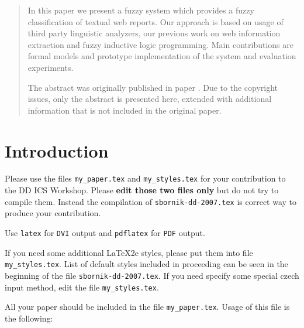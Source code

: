 
\MakeContributionTitle

\begin{multicols}{2}

\begin{abstract}
In this paper we present a fuzzy system which provides a fuzzy classification of textual web reports. Our approach is based on usage of third party linguistic analyzers, our previous work on web information extraction and fuzzy inductive logic programming. Main contributions are formal models and prototype implementation of the system and evaluation experiments. 

\vspace{.2cm}

The abstract was originally published in paper \cite{Dedek:FuzzWI}. Due to the copyright issues, only the abstract is presented here, extended with additional information that is not included in the original paper.
\end{abstract}


\section{Introduction}
Please use the files {\tt my\_paper.tex} and {\tt my\_styles.tex} for your contribution to
the DD ICS Workshop. Please {\bf edit those two files only} but do not try to compile them. 
Instead the compilation of {\tt sbornik-dd-2007.tex} is correct way to produce your
contribution. 

Use  {\tt latex} for {\tt DVI} output and  {\tt pdflatex} for {\tt PDF} output.

 
 If you need some additional \LaTeX2e styles, please put them into file {\tt
   my\_styles.tex}. List of default styles included in proceeding can be seen in the
 beginning of the file {\tt sbornik-dd-2007.tex}.
If you need specify some special czech input method, edit the file {\tt my\_styles.tex}. 


All your paper should be included in the file {\tt my\_paper.tex}. Usage of this file is
the following:



\end{multicols}
